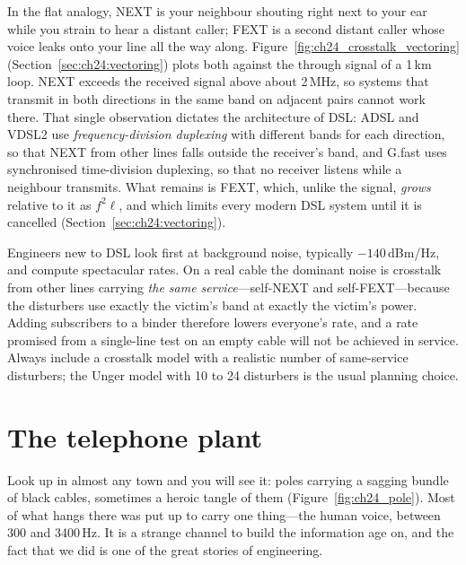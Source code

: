 In the flat analogy, NEXT is your neighbour shouting right next to your ear while you strain to
hear a distant caller; FEXT is a second distant caller whose voice leaks onto your line all the way
along. Figure~\ref{fig:ch24_crosstalk_vectoring} (Section~\ref{sec:ch24:vectoring}) plots both
against the through signal of a 1\,km loop. NEXT exceeds the received signal above about 2\,MHz, so
systems that transmit in both directions in the same band on adjacent pairs cannot work there.
That single observation dictates the architecture of DSL: ADSL and VDSL2 use
\emph{frequency-division duplexing} with different bands for each direction, so that NEXT from
other lines falls outside the receiver's band, and G.fast uses synchronised time-division
duplexing, so that no receiver listens while a neighbour transmits. What remains is FEXT, which,
unlike the signal, \emph{grows} relative to it as $f^2\ell$, and which limits every modern DSL
system until it is cancelled (Section~\ref{sec:ch24:vectoring}).





\begin{pitfall}
Engineers new to DSL look first at background noise, typically $-140$\,dBm/Hz, and compute
spectacular rates. On a real cable the dominant noise is crosstalk from other lines carrying
\emph{the same service}---self-NEXT and self-FEXT---because the disturbers use exactly the victim's
band at exactly the victim's power. Adding subscribers to a binder therefore lowers everyone's
rate, and a rate promised from a single-line test on an empty cable will not be achieved in
service. Always include a crosstalk model with a realistic number of same-service disturbers;
the Unger model with 10 to 24 disturbers is the usual planning choice.
\end{pitfall}

\section{The telephone plant}
\label{sec:ch24:telephone}

Look up in almost any town and you will see it: poles carrying a sagging bundle of black cables,
sometimes a heroic tangle of them (Figure~\ref{fig:ch24_pole}). Most of what hangs there was put up
to carry one thing---the human voice, between 300 and 3400\,Hz. It is a strange channel to build
the information age on, and the fact that we did is one of the great stories of engineering.





